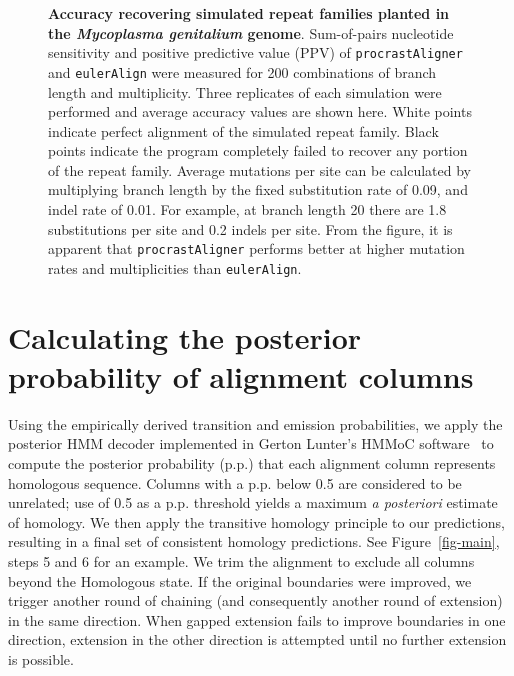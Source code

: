 \documentclass[9.5pt,journal,final,finalsubmission,twocolumn]{IEEEtran}
\begin{document}


\begin{figure*}[t!]
\centering {}
\caption[Accuracy recovering simulated repeat families planted in the
\textit{Mycoplasma genitalium} genome]%
{\textbf{Accuracy recovering simulated repeat families planted in the
\textit{Mycoplasma genitalium} genome}.  Sum-of-pairs nucleotide
sensitivity and positive predictive value (PPV) of \texttt{procrastAligner}
and \texttt{eulerAlign} were measured for 200
combinations of branch length and multiplicity.  Three replicates of
each simulation were performed and average accuracy values are shown
here.  White points indicate perfect alignment of the simulated repeat
family.  Black points indicate the program completely failed to
recover any portion of the repeat family.  Average mutations per site can be
calculated by multiplying branch length by the fixed substitution rate
of 0.09, and indel rate of 0.01.  For example, at branch length 20
there are 1.8 substitutions per site and 0.2 indels per site.  From
the figure, it is apparent that \texttt{procrastAligner} performs better
at higher mutation rates and multiplicities than \texttt{eulerAlign}.}
\label{fig-results}
\end{figure*}

\section{Calculating the posterior probability of alignment columns}
Using the empirically derived transition and emission probabilities,
we apply the posterior HMM decoder implemented in Gerton Lunter's
HMMoC software~\cite{Lunter2007} to compute the posterior probability (p.p.) that
each alignment column represents homologous sequence.  Columns with a
p.p. below 0.5 are considered to be unrelated; use of 0.5 as a p.p. threshold
yields a maximum \textit{a posteriori} estimate of homology.  We then apply the
transitive homology principle to our predictions, resulting in a final
set of consistent homology predictions.  See Figure~\ref{fig-main},
steps 5 and 6 for an example. We trim the alignment to exclude all
columns beyond the Homologous state. If the original boundaries were
improved, we trigger another round of chaining (and consequently
another round of extension) in the same direction.
When gapped extension fails to improve boundaries
in one direction, extension in the other direction is attempted until
no further extension is possible.
\end{document}
